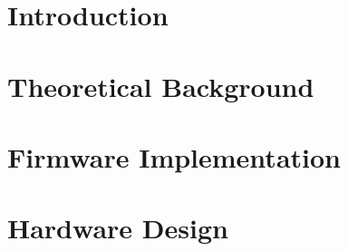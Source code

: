 \documentclass[twoside]{ctuthesis}
\begin{document}
\maketitle %


\part{Introduction}




\part{Theoretical Background}




\part{Firmware Implementation}




\part{Hardware Design}





 
\appendix %

\printbibliography

\end{document}
